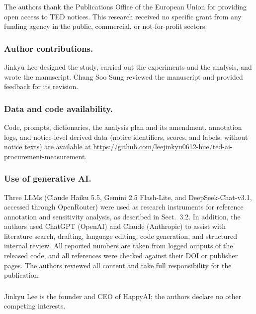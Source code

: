 \documentclass[runningheads]{llncs}
\begin{document}
\begin{credits}
\subsubsection{\ackname} The authors thank the Publications Office of the European Union for providing open access to TED notices. This research received no specific grant from any funding agency in the public, commercial, or not-for-profit sectors.

\subsubsection{Author contributions.} Jinkyu Lee designed the study, carried out the experiments and the analysis, and wrote the manuscript. Chang Soo Sung reviewed the manuscript and provided feedback for its revision.

\subsubsection{Data and code availability.} Code, prompts, dictionaries, the analysis plan and its amendment, annotation logs, and notice-level derived data (notice identifiers, scores, and labels, without notice texts) are available at \url{https://github.com/leejinkyu0612-hue/ted-ai-procurement-measurement}.

\subsubsection{Use of generative AI.} Three LLMs (Claude Haiku 5.5, Gemini 2.5 Flash-Lite, and DeepSeek-Chat-v3.1, accessed through OpenRouter) were used as research instruments for reference annotation and sensitivity analysis, as described in Sect.~3.2. In addition, the authors used ChatGPT (OpenAI) and Claude (Anthropic) to assist with literature search, drafting, language editing, code generation, and structured internal review. All reported numbers are taken from logged outputs of the released code, and all references were checked against their DOI or publisher pages. The authors reviewed all content and take full responsibility for the publication.

\subsubsection{\discintname} Jinkyu Lee is the founder and CEO of HappyAI; the authors declare no other competing interests.
\end{credits}



\end{document}
